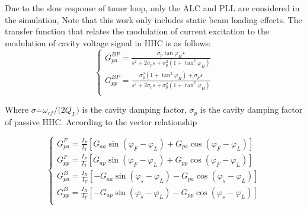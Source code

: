 \documentclass[letterpaper,
               nospread,     %
               ]{jacow}
\begin{document}
Due to the slow response of tuner loop, only the ALC and PLL are considered in the simulation\cite{ref8}, Note that this work only includes static beam loading effects. The transfer function that relates the modulation of current excitation to the modulation of cavity voltage signal in HHC is as follows:
\begin{equation}\label{eq:label}
   \left\{ \begin{matrix}
      G_{pa}^{BP}=\frac{\sigma _{p}^{{}}\tan {{\varphi }_{H}}s}{{{s}^{2}}+2\sigma _{p}^{{}}s+\sigma _{p}^{2}(1+{{\tan }^{2}}{{\varphi }_{H}})}                             \\
      G_{pp}^{BP}=\frac{\sigma _{p}^{2}(1+{{\tan }^{2}}{{\varphi }_{H}})+\sigma _{p}^{{}}s}{{{s}^{2}}+2\sigma _{p}^{{}}s+\sigma _{p}^{2}(1+{{\tan }^{2}}{{\varphi }_{H}})} \\
   \end{matrix} \right.
\end{equation}

Where ${\sigma \text{=}{{{\omega }_{rf}}}/{\text{(}2{{Q}_{L}}\text{)}}}$ is the cavity damping factor, ${{\sigma }_{p}}$ is the cavity damping factor of passive HHC. According to the vector relationship
\begin{small}
   \begin{equation}\label{eq:label}
      \left\{ \begin{matrix}
         G_{pa}^{F}=\frac{{{I}_{F}}}{{{I}_{T}}}\left[ {{G}_{aa}}\sin \left( {{\varphi }_{F}}-{{\varphi }_{L}} \right)+{{G}_{pa}}\cos \left( {{\varphi }_{F}}-{{\varphi }_{L}} \right) \right]  \\
         G_{pp}^{F}=\frac{{{I}_{F}}}{{{I}_{T}}}\left[ {{G}_{ap}}\sin \left( {{\varphi }_{F}}-{{\varphi }_{L}} \right)+{{G}_{pp}}\cos \left( {{\varphi }_{F}}-{{\varphi }_{L}} \right) \right]  \\
         G_{pa}^{B}=\frac{{{I}_{B}}}{{{I}_{T}}}\left[ -{{G}_{aa}}\sin \left( {{\varphi }_{s}}-{{\varphi }_{L}} \right)-{{G}_{pa}}\cos \left( {{\varphi }_{s}}-{{\varphi }_{L}} \right) \right] \\
         G_{pp}^{B}=\frac{{{I}_{B}}}{{{I}_{T}}}\left[ -{{G}_{ap}}\sin \left( {{\varphi }_{s}}-{{\varphi }_{L}} \right)-{{G}_{pp}}\cos \left( {{\varphi }_{s}}-{{\varphi }_{L}} \right) \right] \\
      \end{matrix} \right.
   \end{equation}
\end{small}
\end{document}
